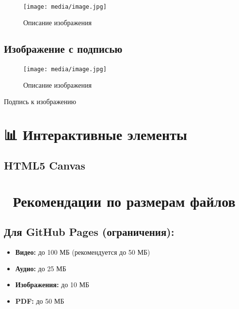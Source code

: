 \documentclass[
  russian,
  12pt,
  a4paper,
]{article}
\providecommand{\tightlist}{%
  \setlength{\itemsep}{0pt}\setlength{\parskip}{0pt}}
\begin{document}
\begin{figure}[H]

{\centering \texttt{[image: media/image.jpg]}

}

\caption{Описание изображения}

\end{figure}%

\subsection{Изображение с
подписью}\label{ux438ux437ux43eux431ux440ux430ux436ux435ux43dux438ux435-ux441-ux43fux43eux434ux43fux438ux441ux44cux44e}

\begin{figure}[H]

{\centering \texttt{[image: media/image.jpg]}

}

\caption{Описание изображения}

\end{figure}%

Подпись к изображению

\section{📊 Интерактивные
элементы}\label{ux438ux43dux442ux435ux440ux430ux43aux442ux438ux432ux43dux44bux435-ux44dux43bux435ux43cux435ux43dux442ux44b}

\subsection{HTML5 Canvas}\label{html5-canvas}

\section{🎯 Рекомендации по размерам
файлов}\label{ux440ux435ux43aux43eux43cux435ux43dux434ux430ux446ux438ux438-ux43fux43e-ux440ux430ux437ux43cux435ux440ux430ux43c-ux444ux430ux439ux43bux43eux432}

\subsection{Для GitHub Pages
(ограничения):}\label{ux434ux43bux44f-github-pages-ux43eux433ux440ux430ux43dux438ux447ux435ux43dux438ux44f}

\begin{itemize}
\tightlist
\item
  \textbf{Видео:} до 100 МБ (рекомендуется до 50 МБ)
\item
  \textbf{Аудио:} до 25 МБ
\item
  \textbf{Изображения:} до 10 МБ
\item
  \textbf{PDF:} до 50 МБ
\end{itemize}
\end{document}
